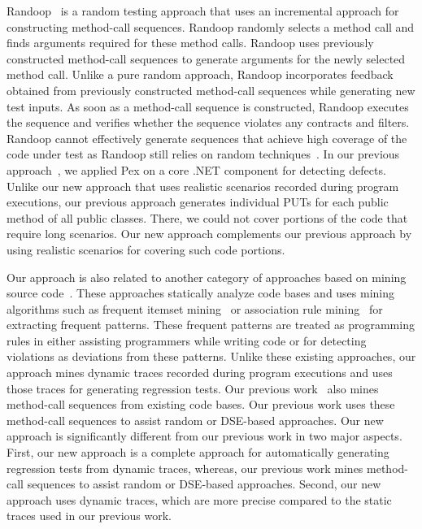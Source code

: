 Randoop~\cite{pacheco:feedback} is a random testing approach that uses an incremental approach for constructing method-call sequences. Randoop randomly selects a method call and finds arguments required for these method calls. Randoop uses previously constructed method-call sequences to generate arguments for the newly selected method call. Unlike a pure random approach, Randoop incorporates feedback obtained from previously constructed method-call sequences while generating new test inputs. As soon as a method-call sequence is constructed, Randoop executes the sequence and verifies whether the sequence violates any contracts and filters. Randoop cannot effectively generate sequences that achieve high coverage of the code under test as Randoop still relies on random techniques~\cite{thummalapenta09:mseqgen}. In our previous approach~\cite{tillman:pexwhite}, we applied Pex on a core .NET component for detecting defects. Unlike our new approach that uses realistic scenarios recorded during program executions, our previous approach generates individual PUTs for each public method of all public classes. There, we could not cover portions of the code that require long scenarios. Our new approach complements our previous approach by using realistic scenarios for covering such code portions.

Our approach is also related to another category of approaches based on mining source code~\cite{Engler2001deviant, acharya06:mining, wasylkowski07:detecting, thummalapenta09:mseqgen}. These approaches statically analyze code bases and uses mining algorithms such as frequent itemset mining~\cite{wang:bide} or association rule mining~\cite{agarwal:association} for extracting frequent patterns. These frequent patterns are treated as programming rules in either assisting programmers while writing code or for detecting violations as deviations from these patterns. Unlike these existing approaches, our approach mines dynamic traces recorded during program executions and uses those traces for generating regression tests. Our previous work~\cite{thummalapenta09:mseqgen} also mines method-call sequences from existing code bases. Our previous work uses these method-call sequences to assist random or DSE-based approaches. Our new approach is significantly different from our previous work in two major aspects. First, our new approach is a complete approach for automatically generating regression tests from dynamic traces, whereas, our previous work mines method-call sequences to assist random or DSE-based approaches. Second, our new approach uses dynamic traces, which are more precise compared to the static traces used in our previous work.